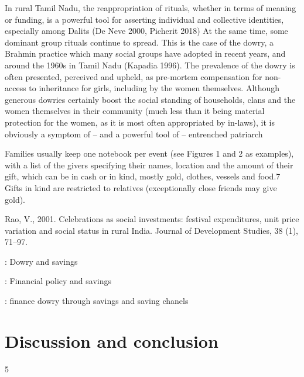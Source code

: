 \documentclass[a4paper, 11pt, onecolumn]{article}
\begin{document}
 In rural Tamil Nadu, the reappropriation of rituals, whether in terms of meaning or funding, is a powerful
tool for asserting individual and collective identities, especially among Dalits (De Neve 2000, Picherit
2018) At the same time, some dominant group rituals continue to spread. This is the case of the
dowry, a Brahmin practice which many social groups have adopted in recent years, and around
the 1960s in Tamil Nadu (Kapadia 1996). The prevalence of the dowry is often presented, perceived
and upheld, as pre-mortem compensation for non-access to inheritance for girls, including by the
women themselves. Although generous dowries certainly boost the social standing of households,
clans and the women themselves in their community (much less than it being material protection
for the women, as it is most often appropriated by in-laws), it is obviously a symptom of – and a
powerful tool of – entrenched patriarch

Families usually keep one notebook per event (see Figures 1 and 2 as examples), with a list of the
givers specifying their names, location and the amount of their gift, which can be in cash or in
kind, mostly gold, clothes, vessels and food.7 Gifts in kind are restricted to relatives (exceptionally
close friends may give gold).








Rao, V., 2001. Celebrations as social investments: festival expenditures, unit price variation and social status in rural
India. Journal of Development Studies, 38 (1), 71–97.




\cite{Heyer1992} : Dowry and savings

\cite{Goedecke2018} : Financial policy and savings

\cite{Anukriti2020} : finance dowry through savings and saving chanels






\section{Discussion and conclusion}
\label{section:conclusion}











\newpage
%


\clearpage
\newpage
\setcounter{tocdepth}5
\tableofcontents

\end{document}
